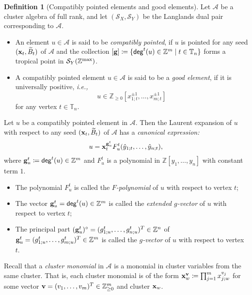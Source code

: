\documentclass[12pt]{amsart}
\theoremstyle{definition}
\newtheorem{definition}[theorem]{Definition}
\theoremstyle{remark}
\numberwithin{equation}{section}
\newcommand{\opname}[1]{\operatorname{\mathsf{#1}}}
\newcommand{\de}{\opname{deg}}
\newcommand{\ie}{\textit{i.e.,}\ }
\begin{document}
\begin{definition}[Compatibly pointed elements and good elements]\label{def:pointed}
Let $\mathcal A$ be a cluster algebra of full rank, and let  $(\mathcal S_X,\mathcal S_Y)$ be the Langlands dual pair corresponding to $\mathcal A$.
 \begin{itemize}
 \item[(i)] An element $u\in\mathcal A$ is said to be {\em compatibly pointed}, if $u$ is pointed for any seed $({\bf x}_t,\widetilde B_t)$ of $\mathcal A$ and the collection $[{\bf g}] \coloneqq   \{\de^t(u)\in\mathbb Z^m\mid t\in\mathbb T_n\}$ forms a tropical point in $\mathcal S_Y(\mathbb Z^{\rm max})$. 

 \item [(ii)] A compatibly pointed element  $u\in\mathcal A$ is said to be a {\em good element}, if it is universally positive,  \ie $$u\in\mathbb Z_{\geq 0}[x_{1;t}^{\pm 1},\ldots,x_{m;t}^{\pm 1}]$$ for any vertex $t\in\mathbb T_n$.
\end{itemize}
\end{definition}



 Let $u$ be a compatibly pointed element in $\mathcal A$.  Then the Laurent expansion of  $u$ with respect to any seed $({\bf x}_t,\widetilde B_t)$ of $\mathcal A$ has a {\em canonical expression:}
\begin{eqnarray}\label{eqn:upointed}
   u={\bf x}_t^{{\bf g}_u^t}F_u^t(\hat y_{1;t},\ldots,\hat y_{n;t}),
 \end{eqnarray}
where ${\bf g}_u^t\coloneq \de^t(u)\in\mathbb Z^m$ and $F_u^t$ is a polynomial in $\mathbb Z[y_1,\ldots,y_n]$ with constant term $1$.
\begin{itemize}
\item The polynomial $F_u^t$ is called the {\em $F$-polynomial} of $u$ with respect to vertex $t$;
\item The vector ${\bf g}_u^t=\de^t(u)\in\mathbb Z^m$ is  called the {\em extended $g$-vector} of $u$ with respect to vertex $t$;

\item The principal part $({\bf g}_u^t)^\circ=(g_{1;u}^t,\ldots,g_{n;u}^t)^T\in\mathbb Z^n$ of ${\bf g}_u^t=(g_{1;u}^t,\ldots,g_{m;u}^t)^T\in\mathbb Z^m$ is called the {\em $g$-vector} of $u$ with respect to vertex $t$.
\end{itemize}


 Recall that a {\em cluster monomial} in  $\mathcal A$ is a monomial in cluster variables from the same cluster. That is, each cluster monomial is of the form
 ${\bf x}_w^{\bf v} \coloneqq   \prod_{j=1}^mx_{j;w}^{v_j}$
for  some vector ${\bf v}=(v_1,\ldots,v_m)^T\in \mathbb Z_{\geq 0}^m$ and cluster ${\bf x}_w$.
\end{document}
